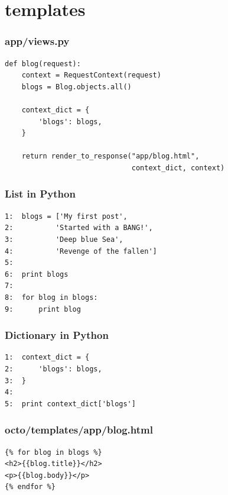 \documentclass[bigger, presentation]{beamer}
\begin{document}
\section{templates}
\label{sec-3}
\begin{frame}[fragile]
\frametitle{app/views.py}
\label{sec-3-1}



\begin{verbatim}
def blog(request):
    context = RequestContext(request)
    blogs = Blog.objects.all()

    context_dict = {
        'blogs': blogs,
    }

    return render_to_response("app/blog.html",
                              context_dict, context)
\end{verbatim}
\end{frame}
\begin{frame}[fragile]
\frametitle{List in Python}
\label{sec-3-2}

   

\begin{verbatim}
1:  blogs = ['My first post',
2:          'Started with a BANG!',
3:          'Deep blue Sea',
4:          'Revenge of the fallen']
5:  
6:  print blogs
7:  
8:  for blog in blogs:
9:      print blog
\end{verbatim}
   
\end{frame}
\begin{frame}[fragile]
\frametitle{Dictionary in Python}
\label{sec-3-3}

   

\begin{verbatim}
1:  context_dict = {
2:      'blogs': blogs,
3:  }
4:  
5:  print context_dict['blogs']
\end{verbatim}
\end{frame}
\begin{frame}[fragile]
\frametitle{octo/templates/app/blog.html}
\label{sec-3-4}



\begin{verbatim}
{% for blog in blogs %}
<h2>{{blog.title}}</h2>
<p>{{blog.body}}</p>
{% endfor %}
\end{verbatim}

   
\end{frame}
\end{document}
